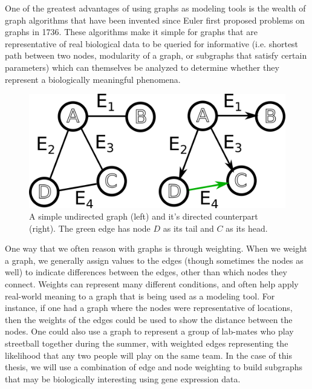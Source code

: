 \documentclass[12pt,twoside]{reedthesis}
\theoremstyle{definition}
\begin{document}
  One of the greatest advantages of using graphs as modeling tools is the wealth of graph algorithms that have been invented since Euler first proposed problems on graphs in 1736. These algorithms make it simple for graphs that are representative of real biological data to be queried for informative (i.e. shortest path between two nodes, modularity of a graph, or subgraphs that satisfy certain parameters) which can themselves be analyzed to determine whether they represent a biologically meaningful phenomena.\par

  \begin{figure}[!h]
    \begin{center}
      \includegraphics[width=\textwidth/2]{simple_graph_du}
    \caption[Undirected \& Directed Graphs]{A simple undirected graph (left) and it's directed counterpart (right). The green edge has node $D$ as its tail and $C$ as its head.}
    \label{fig:simple_graph_du}
    \end{center}
  \end{figure}

  One way that we often reason with graphs is through weighting. When we weight a graph, we generally assign values to the edges (though sometimes the nodes as well) to indicate differences between the edges, other than which nodes they connect. Weights can represent many different conditions, and often help apply real-world meaning to a graph that is being used as a modeling tool. For instance, if one had a graph where the nodes were representative of locations, then the weights of the edges could be used to show the distance between the nodes. One could also use a graph to represent a group of lab-mates who play streetball together during the summer, with weighted edges representing the likelihood that any two people will play on the same team. In the case of this thesis, we will use a combination of edge and node weighting to build subgraphs that may be biologically interesting using gene expression data.\par
\end{document}
